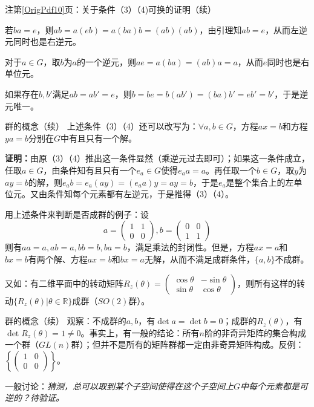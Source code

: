 \documentclass{beamer}
\newcommand{\refpage}[1]{注第\ref{OrigPdf#1}页}%
\begin{document}
\begin{frame}{\refpage{10}：关于条件（3）（4)可换的证明（续）}
	
	若$ba=e$，则$ab=a(eb)=a(ba)b=(ab)(ab)$，由引理知$ab=e$，从而左逆元同时也是右逆元。
	
	对于$a\in G$，取$b$为$a$的一个逆元，则$ae=a(ba)=(ab)a=a$，从而$e$同时也是右单位元。
	
	如果存在$b,b'$满足$ab=ab'=e$，则$b=be=b(ab')=(ba)b'=eb'=b'$，于是逆元唯一。\qedsymbol
	
\end{frame}

\begin{frame}{群的概念（续）}
上述条件（3）（4）还可以改写为：$\forall a,b\in G$，方程$ax=b$和方程$ya=b$分别在$G$中有且只有一个解。

\textbf{证明：}由原（3）（4）推出这一条件显然（乘逆元过去即可）；如果这一条件成立，任取$a\in G$，由条件知有且只有一个$e_a\in G$使得$e_aa=a$。再任取一个$b\in G$，取$y$为$ay=b$的解，则$e_ab=e_a(ay)=(e_aa)y=ay=b$，于是$e_a$是整个集合上的左单位元。又由条件知每个元素都有左逆元，于是推得（3）（4）。\qedsymbol

用上述条件来判断是否成群的例子：设
\begin{equation*}
a=\begin{pmatrix}1 & 1 \\ 0 & 0\end{pmatrix}, b=\begin{pmatrix}0 & 0 \\ 1 & 1\end{pmatrix}
\end{equation*}
则有$aa=a,ab=a,bb=b,ba=b$，满足乘法的封闭性。但是，方程$ax=a$和$bx=b$有两个解、方程$ax=b$和$bx=a$无解，从而不满足成群条件，$\{a,b\}$不成群。

又如：有二维平面中的转动矩阵$R_z(\theta)=\begin{pmatrix}\cos\theta & -\sin\theta \\ \sin\theta & \cos\theta\end{pmatrix}$，则所有这样的转动$\{R_z(\theta)|\theta\in\mathbb{R}\}$成群（$SO(2)$群）。
\end{frame}

\begin{frame}{群的概念（续）}
观察：不成群的$a,b$，有$\det a=\det b=0$；成群的$R_z(\theta)$，有$\det R_z(\theta)=1\neq 0$。事实上，有一般的结论：所有$n$阶的非奇异矩阵的集合构成一个群（$GL(n)$群）；但并不是所有的矩阵群都一定由非奇异矩阵构成。反例：$\left\{\begin{pmatrix}1 & 0 \\ 0 & 0\end{pmatrix}\right\}$。

一般讨论：\textit{猜测，总可以取到某个子空间使得在这个子空间上$G$中每个元素都是可逆的？待验证。}
\end{frame}
\end{document}

